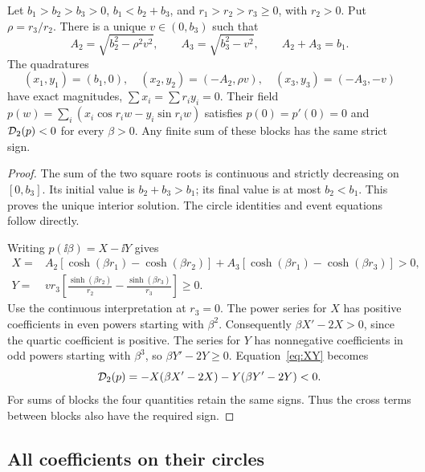 \begin{lemma}\label{lem:triple}
Let \(b_1>b_2>b_3>0\), \(b_1<b_2+b_3\), and
\(r_1>r_2>r_3\ge0\), with \(r_2>0\). Put \(\rho=r_3/r_2\).
There is a unique \(v\in(0,b_3)\) such that
\[
 A_2=\sqrt{b_2^2-\rho^2v^2},\qquad
 A_3=\sqrt{b_3^2-v^2},\qquad A_2+A_3=b_1.
\]
The quadratures
\begin{equation}\label{eq:triple}
 (x_1,y_1)=(b_1,0),\quad
 (x_2,y_2)=(-A_2,\rho v),\quad
 (x_3,y_3)=(-A_3,-v)
\end{equation}
have exact magnitudes, \(\sum x_i=\sum r_i y_i=0\).
Their field \(p(w)=\sum_i(x_i\cos r_iw-y_i\sin r_iw)\) satisfies
\(p(0)=p'(0)=0\) and \(\mathcal D_2(p)<0\) for every \(\beta>0\).
Any finite sum of these blocks has the same strict sign.
\end{lemma}
\begin{proof}
The sum of the two square roots is continuous and strictly decreasing
on \([0,b_3]\). Its initial value is \(b_2+b_3>b_1\); its final value
is at most \(b_2<b_1\). This proves the unique interior solution.
The circle identities and event equations follow directly.

Writing \(p(\ii\beta)=X-\ii Y\) gives
\begin{align}
 X={}&A_2[\cosh(\beta r_1)-\cosh(\beta r_2)]
      +A_3[\cosh(\beta r_1)-\cosh(\beta r_3)]>0,\\
 Y={}&vr_3\left[\frac{\sinh(\beta r_2)}{r_2}
                       -\frac{\sinh(\beta r_3)}{r_3}\right]\ge0.
 \label{eq:tripleXY}
\end{align}
Use the continuous interpretation at \(r_3=0\). The power series for
\(X\) has positive coefficients in even powers starting with
\(\beta^2\). Consequently \(\beta X'-2X>0\), since the quartic
coefficient is positive. The series for \(Y\) has nonnegative
coefficients in odd powers starting with \(\beta^3\), so
\(\beta Y'-2Y\ge0\).
Equation~\eqref{eq:XY} becomes
\[
 \mathcal D_2(p)=-X(\beta X'-2X)-Y(\beta Y'-2Y)<0.
\]
For sums of blocks the four quantities retain the same signs.
Thus the cross terms between blocks also have the required sign.
\end{proof}

\subsection{All coefficients on their circles}

